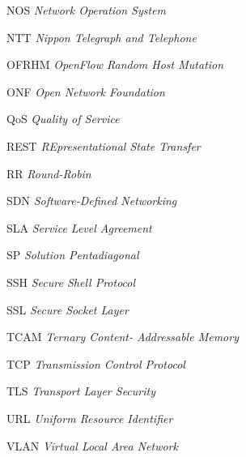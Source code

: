\begin{siglas}
	\item[NOS]{\textit{Network Operation System}}
	\item[NTT]{\textit{Nippon Telegraph and Telephone}}
	\item[OFRHM]{\textit{OpenFlow Random Host Mutation}}
	\item[ONF]{\textit{Open Network Foundation}}
	\item[QoS]{\textit{Quality of Service}}
	\item[REST]{\textit{REpresentational State Transfer}}
	\item[RR]{\textit{Round-Robin}}
	\item[SDN]{\textit{Software-Defined Networking}}
	\item[SLA]{\textit{Service Level Agreement}}
	\item[SP]{\textit{Solution Pentadiagonal}}
	\item[SSH]{\textit{Secure Shell Protocol}}
	\item[SSL]{\textit{Secure Socket Layer}}
	\item[TCAM]{\textit{Ternary Content- Addressable Memory}}
	\item[TCP]{\textit{Transmission Control Protocol}}
	\item[TLS]{\textit{Transport Layer Security}}
	\item[URL]{\textit{Uniform Resource Identifier}}
	\item[VLAN]{\textit{Virtual Local Area Network}}
	
	
\end{siglas}




